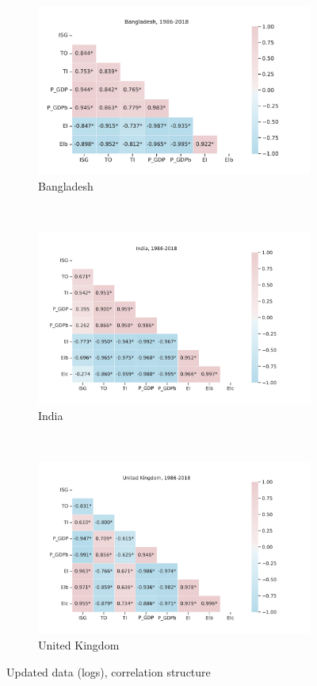 \documentclass[11pt,a4paper]{article}
\begin{document}
\begin{figure}[htbp]
\centering
\begin{subfigure}{0.7\textwidth}
\includegraphics[width=\textwidth]{./plots/BGD_current_correlations.pdf}
\caption{Bangladesh}
\end{subfigure}\\
\begin{subfigure}{0.7\textwidth}
\includegraphics[width=\textwidth]{./plots/IND_current_correlations.pdf}
\caption{India}
\end{subfigure}\\
\begin{subfigure}{0.7\textwidth}
\includegraphics[width=\textwidth]{./plots/GBR_current_correlations.pdf}
\caption{United Kingdom}
\end{subfigure}
\caption{Updated data (logs), correlation structure}
\label{fig:log_correlations}
\end{figure}
\end{document}
